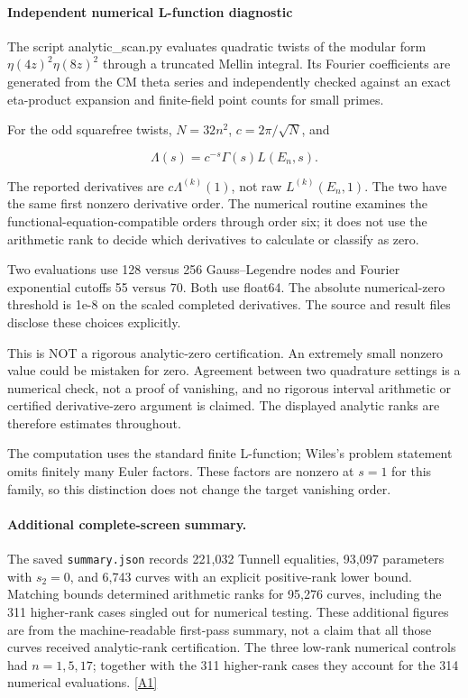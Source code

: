 \documentclass[11pt]{article}
\newcommand{\srcref}[1]{\hyperlink{source:#1}{[#1]}}
\begin{document}
\paragraph{Independent numerical L-function diagnostic}

The script analytic\_scan.py evaluates quadratic twists of the modular form \(\eta(4z)^2\eta(8z)^2\) through a truncated Mellin integral. Its Fourier coefficients are generated from the CM theta series and independently checked against an exact eta-product expansion and finite-field point counts for small primes.

For the odd squarefree twists, \(N=32n^2\), \(c=2\pi/\sqrt N\), and

\[\Lambda(s)=c^{-s}\Gamma(s)L(E_n,s).\]

The reported derivatives are \(c\Lambda^{(k)}(1)\), not raw \(L^{(k)}(E_n,1)\). The two have the same first nonzero derivative order. The numerical routine examines the functional-equation-compatible orders through order six; it does not use the arithmetic rank to decide which derivatives to calculate or classify as zero.

Two evaluations use 128 versus 256 Gauss--Legendre nodes and Fourier exponential cutoffs 55 versus 70. Both use float64. The absolute numerical-zero threshold is 1e-8 on the scaled completed derivatives. The source and result files disclose these choices explicitly.

This is NOT a rigorous analytic-zero certification. An extremely small nonzero value could be mistaken for zero. Agreement between two quadrature settings is a numerical check, not a proof of vanishing, and no rigorous interval arithmetic or certified derivative-zero argument is claimed. The displayed analytic ranks are therefore estimates throughout.

The computation uses the standard finite L-function; Wiles's problem statement omits finitely many Euler factors. These factors are nonzero at \(s=1\) for this family, so this distinction does not change the target vanishing order.

\paragraph{Additional complete-screen summary.}
The saved \nolinkurl{summary.json} records 221,032 Tunnell equalities,
93,097 parameters with $s_2=0$, and 6,743 curves with an explicit positive-rank
lower bound. Matching bounds determined arithmetic ranks for 95,276 curves,
including the 311 higher-rank cases singled out for numerical testing.
These additional figures are from the machine-readable first-pass summary,
not a claim that all those curves received analytic-rank certification.
The three low-rank numerical controls had $n=1,5,17$; together with the
311 higher-rank cases they account for the 314 numerical evaluations.
\srcref{A1}
\end{document}
